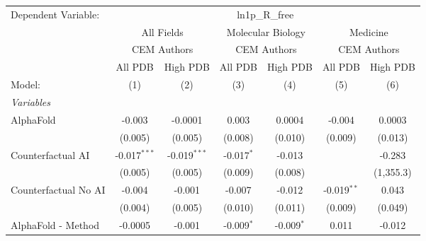 \begingroup
\centering
\begin{tabular}{lcccccc}
   \tabularnewline \midrule \midrule
   Dependent Variable: & \multicolumn{6}{c}{ln1p\_R\_free}\\
 & \multicolumn{2}{c}{All Fields} & \multicolumn{2}{c}{Molecular Biology} & \multicolumn{2}{c}{Medicine} \\
\cmidrule(lr){2-3} \cmidrule(lr){4-5} \cmidrule(lr){6-7}
 & \multicolumn{2}{c}{CEM Authors} & \multicolumn{2}{c}{CEM Authors} & \multicolumn{2}{c}{CEM Authors} \\
\cmidrule(lr){2-3} \cmidrule(lr){4-5} \cmidrule(lr){6-7}
 & \multicolumn{1}{c}{All PDB} & \multicolumn{1}{c}{High PDB} & \multicolumn{1}{c}{All PDB} & \multicolumn{1}{c}{High PDB} & \multicolumn{1}{c}{All PDB} & \multicolumn{1}{c}{High PDB} \\
\cmidrule(lr){2-2} \cmidrule(lr){3-3} \cmidrule(lr){4-4} \cmidrule(lr){5-5} \cmidrule(lr){6-6} \cmidrule(lr){7-7}
   Model:                                                     & (1)            & (2)            & (3)           & (4)          & (5)           & (6)\\  
   \midrule
   \emph{Variables}\\
   AlphaFold                                                  & -0.003         & -0.0001        & 0.003         & 0.0004       & -0.004        & 0.0003\\   
                                                              & (0.005)        & (0.005)        & (0.008)       & (0.010)      & (0.009)       & (0.013)\\   
   Counterfactual AI                                          & -0.017$^{***}$ & -0.019$^{***}$ & -0.017$^{*}$  & -0.013       &               & -0.283\\   
                                                              & (0.005)        & (0.005)        & (0.009)       & (0.008)      &               & (1,355.3)\\   
   Counterfactual No AI                                       & -0.004         & -0.001         & -0.007        & -0.012       & -0.019$^{**}$ & 0.043\\   
                                                              & (0.004)        & (0.005)        & (0.010)       & (0.011)      & (0.009)       & (0.049)\\   
   AlphaFold - Method                                         & -0.0005        & -0.001         & -0.009$^{*}$  & -0.009$^{*}$ & 0.011         & -0.012\\   

\end{tabular}
